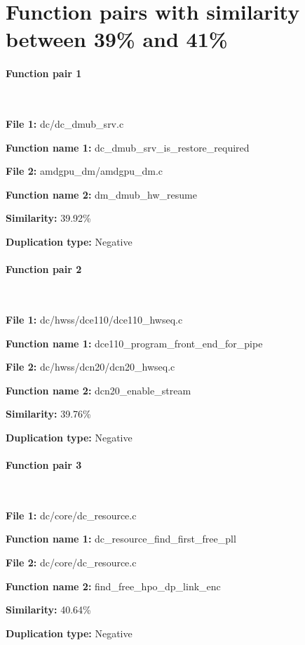 \section{Function pairs with similarity between 39\% and 41\%}

\paragraph{Function pair 1 }  

\

\textbf{File 1:} dc/dc\_dmub\_srv.c

\textbf{Function name 1:} dc\_dmub\_srv\_is\_restore\_required

\textbf{File 2:} amdgpu\_dm/amdgpu\_dm.c

\textbf{Function name 2:} dm\_dmub\_hw\_resume

\textbf{Similarity:} 39.92\%

\textbf{Duplication type:} Negative


\paragraph{Function pair 2 }  

\

\textbf{File 1:} dc/hwss/dce110/dce110\_hwseq.c

\textbf{Function name 1:} dce110\_program\_front\_end\_for\_pipe

\textbf{File 2:} dc/hwss/dcn20/dcn20\_hwseq.c

\textbf{Function name 2:} dcn20\_enable\_stream

\textbf{Similarity:} 39.76\%

\textbf{Duplication type:} Negative


\paragraph{Function pair 3 }  

\

\textbf{File 1:} dc/core/dc\_resource.c

\textbf{Function name 1:} dc\_resource\_find\_first\_free\_pll

\textbf{File 2:} dc/core/dc\_resource.c

\textbf{Function name 2:} find\_free\_hpo\_dp\_link\_enc

\textbf{Similarity:} 40.64\%

\textbf{Duplication type:} Negative


